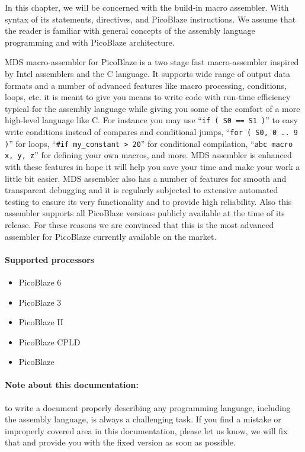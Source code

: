 In this chapter, we will be concerned with the build-in macro assembler. With syntax of its statements, directives, and PicoBlaze instructions. We assume that the reader is familiar with general concepts of the assembly language programming and with PicoBlaze architecture.

MDS macro-assembler for PicoBlaze is a two stage fast macro-assembler inspired by Intel assemblers and the C language. It supports wide range of output data formats and a number of advanced features like macro processing, conditions, loops, etc. it is meant to give you means to write code with run-time efficiency typical for the assembly language while giving you some of the comfort of a more high-level language like C. For instance you may use ``\verb'if ( S0 == S1 )''' to easy write conditions instead of compares and conditional jumps, ``\verb'for ( S0, 0 .. 9 )''' for loops, ``\verb'#if my_constant > 20''' for conditional compilation, ``\verb'abc macro x, y, z''' for defining your own macros, and more. MDS assembler is enhanced with these features in hope it will help you save your time and make your work a little bit easier. MDS assembler also has a number of features for smooth and transparent debugging and it is regularly subjected to extensive automated testing to ensure its very functionality and to provide high reliability. Also this assembler supports all PicoBlaze versions publicly available at the time of its release. For these reasons we are convinced that this is the most advanced assembler for PicoBlaze currently available on the market.

\paragraph{Supported processors}
    \begin{itemize}
        \item PicoBlaze 6
        \item PicoBlaze 3
        \item PicoBlaze II
        \item PicoBlaze CPLD
        \item PicoBlaze
    \end{itemize}

\paragraph{Note about this documentation:}
    to write a document properly describing any programming language, including the assembly language, is always a challenging task. If you find a mistake or improperly covered area in this documentation, please let us know, we will fix that and provide you with the fixed version as soon as possible.

